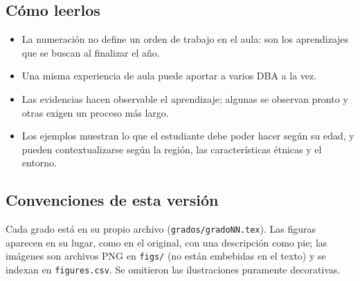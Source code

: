 \subsection*{Cómo leerlos}
\begin{itemize}[nosep]
  \item La numeración no define un orden de trabajo en el aula: son los aprendizajes que se
    buscan al finalizar el año.
  \item Una misma experiencia de aula puede aportar a varios DBA a la vez.
  \item Las evidencias hacen observable el aprendizaje; algunas se observan pronto y otras
    exigen un proceso más largo.
  \item Los ejemplos muestran lo que el estudiante debe poder hacer según su edad, y pueden
    contextualizarse según la región, las características étnicas y el entorno.
\end{itemize}

\subsection*{Convenciones de esta versión}
Cada grado está en su propio archivo (\texttt{grados/gradoNN.tex}). Las figuras aparecen
en su lugar, como en el original, con una descripción como pie; las imágenes son archivos
PNG en \texttt{figs/} (no están embebidas en el texto) y se indexan en \texttt{figures.csv}.
Se omitieron las ilustraciones puramente decorativas.
